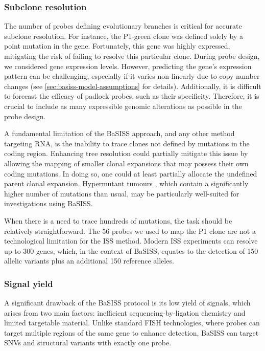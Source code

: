 \subsubsection*{Subclone resolution}
The number of probes defining evolutionary branches is critical for accurate subclone resolution. For instance, the P1-green clone was defined solely by a point mutation in the  gene. Fortunately, this gene was highly expressed, mitigating the risk of failing to resolve this particular clone. During probe design, we considered gene expression levels. However, predicting the gene's expression pattern can be challenging, especially if it varies non-linearly due to copy number changes (see \cref{sec:basiss-model-assumptions} for details). Additionally, it is difficult to forecast the efficacy of padlock probes, such as their specificity. Therefore, it is crucial to include as many expressible genomic alterations as possible in the probe design.

A fundamental limitation of the \ac{BaSISS} approach, and any other method targeting RNA, is the inability to trace clones not defined by mutations in the coding region. Enhancing tree resolution could partially mitigate this issue by allowing the mapping of smaller clonal expansions that may possess their own coding mutations. In doing so, one could at least partially allocate the undefined parent clonal expansion. Hypermutant tumours \parencite{Alexandrov2020-uo}, which contain a significantly higher number of mutations than usual, may be particularly well-suited for investigations using \ac{BaSISS}.

When there is a need to trace hundreds of mutations, the task should be relatively straightforward. The 56 probes we used to map the P1 clone are not a technological limitation for the \ac{ISS} method. Modern \ac{ISS} experiments can resolve up to 300 genes, which, in the context of \ac{BaSISS}, equates to the detection of 150 allelic variants plus an additional 150 reference alleles.

\subsubsection*{Signal yield}

A significant drawback of the \ac{BaSISS} protocol is its low yield of signals, which arises from two main factors: inefficient sequencing-by-ligation chemistry and limited targetable material. Unlike standard FISH technologies, where probes can target multiple regions of the same gene to enhance detection, \ac{BaSISS} can target \acp{SNV} and structural variants with exactly one probe.

